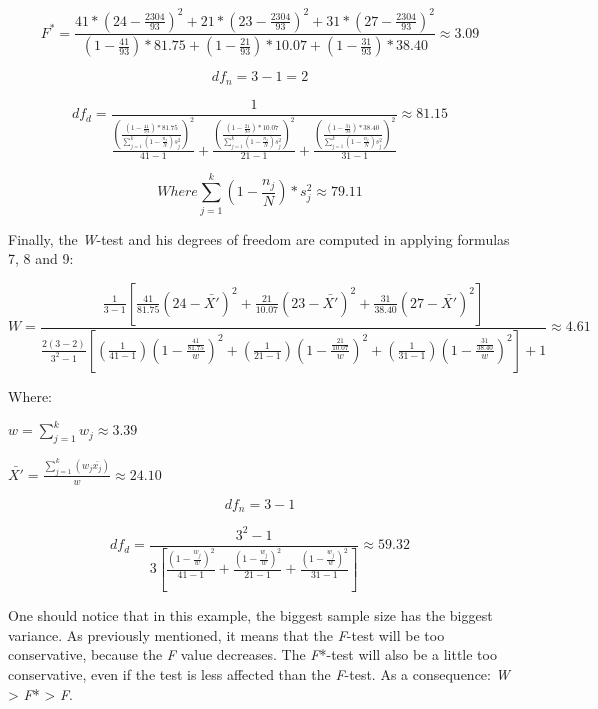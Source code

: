 \documentclass[man,floatsintext]{apa6}
\begin{document}
\begin{appendix}
\[
F^*=\frac{41*(24-\frac{2304}{93})^2+21*(23-\frac{2304}{93})^2+31*(27-\frac{2304}{93})^2}{(1-\frac{41}{93})*81.75+(1-\frac{21}{93})*10.07+(1-\frac{31}{93})*38.40} \approx 3.09
\]

\[
df_n=3-1=2
\]

\[
df_d=\frac{1}{\frac{(\frac{(1-\frac{41}{93})*81.75}{\sum_{j=1}^k(1-\frac{n_j}{N})s_j^2})^2}{41-1}+\frac{(\frac{(1-\frac{21}{93})*10.07}{\sum_{j=1}^k(1-\frac{n_j}{N})s_j^2})^2}{21-1}+\frac{(\frac{(1-\frac{31}{93})*38.40}{\sum_{j=1}^k(1-\frac{n_j}{N})s_j^2})^2}{31-1}} \approx 81.15
\]

\[ Where \sum_{j=1}^k(1-\frac{n_j}{N})*s_j^2 \approx 79.11\]

Finally, the \emph{W}-test and his degrees of freedom are computed in
applying formulas 7, 8 and 9:

\[
W=\frac{\frac{1}{3-1}[\frac{41}{81.75}(24-\bar{X'})^2+\frac{21}{10.07}(23-\bar{X'})^2+\frac{31}{38.40}(27-\bar{X'})^2]}
{\frac{2(3-2)}{3^2-1}[(\frac{1}{41-1})(1-\frac{\frac{41}{81.75}}{w})^2+(\frac{1}{21-1})(1-\frac{\frac{21}{10.07}}{w})^2+(\frac{1}{31-1})(1-\frac{\frac{31}{38.40}}{w})^2]+1} \approx 4.61
\]

Where:

\(w=\sum_{j=1}^k w_j \approx 3.39\)

\(\bar{X'}=\frac{\sum_{j=1}^k (w_j\bar{x_j})}{w} \approx 24.10\)

\[
df_n=3-1
\]

\[
df_d=\frac{3^2-1}{3[\frac{(1-\frac{w_j}{w})^2}{41-1}+\frac{(1-\frac{w_j}{w})^2}{21-1}+\frac{(1-\frac{w_j}{w})^2}{31-1}]} \approx 59.32
\]

One should notice that in this example, the biggest sample size has the
biggest variance. As previously mentioned, it means that the
\emph{F}-test will be too conservative, because the \emph{F} value
decreases. The \emph{F}*-test will also be a little too conservative,
even if the test is less affected than the \emph{F}-test. As a
consequence: \emph{W} \textgreater{} \emph{F}* \textgreater{} \emph{F}.
\end{appendix}
\end{document}
